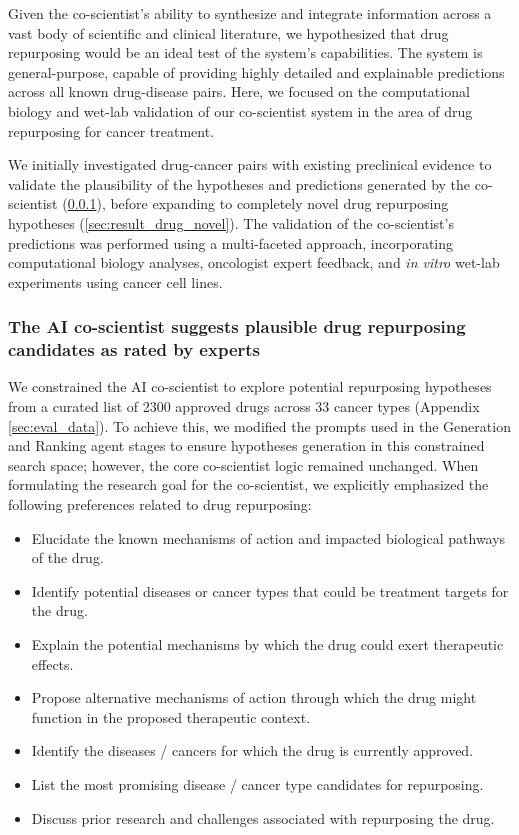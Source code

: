 Given the co-scientist's ability to synthesize and integrate information across a vast body of scientific and clinical literature, we hypothesized that drug repurposing would be an ideal test of the system's capabilities. The system is general-purpose, capable of providing highly detailed and explainable predictions across all known drug-disease pairs. Here, we focused on the computational biology and wet-lab validation of our co-scientist system in the area of drug repurposing for cancer treatment.

We initially investigated drug-cancer pairs with existing preclinical evidence to validate the plausibility of the hypotheses and predictions generated by the co-scientist (\cref{sec:result_drug_pre}), before expanding to completely novel drug repurposing hypotheses (\cref{sec:result_drug_novel}). The validation of the co-scientist's predictions was performed using a multi-faceted approach, incorporating computational biology analyses, oncologist expert feedback, and \textit{in vitro} wet-lab experiments using cancer cell lines.

\subsubsection{The AI co-scientist suggests plausible drug repurposing candidates as rated by experts}
\label{sec:result_drug_pre}
We constrained the AI co-scientist to explore potential repurposing hypotheses from a curated list of 2300 approved drugs across 33 cancer types (Appendix \cref{sec:eval_data}). To achieve this, we modified the prompts used in the Generation and Ranking agent stages to ensure hypotheses generation in this constrained search space; however, the core co-scientist logic remained unchanged. When formulating the research goal for the co-scientist, we explicitly emphasized the following preferences related to drug repurposing:
\begin{itemize}
    \item Elucidate the known mechanisms of action and impacted biological pathways of the drug.
    \item Identify potential diseases or cancer types that could be treatment targets for the drug.
    \item Explain the potential mechanisms by which the drug could exert therapeutic effects.
    \item Propose alternative mechanisms of action through which the drug might function in the proposed therapeutic context.
    \item Identify the diseases / cancers for which the drug is currently approved.
    \item List the most promising disease / cancer type candidates for repurposing.
    \item Discuss prior research and challenges associated with repurposing the drug.
\end{itemize}

